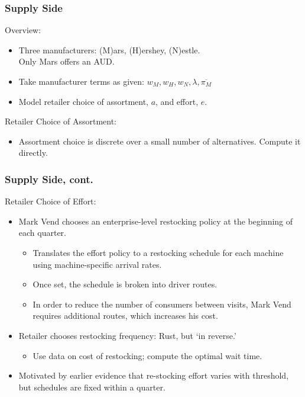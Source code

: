 \documentclass[aspectratio=169]{beamer}
\begin{document}
\begin{frame}
\frametitle{Supply Side}
Overview:
\begin{itemize}
\item Three manufacturers:  (M)ars, (H)ershey, (N)estle. \\ Only Mars offers an AUD.
\item Take manufacturer terms as given: $w_M, w_H, w_N, \lambda, \overline{\pi_M}$
\item Model retailer choice of assortment, $a$, and effort, $e$.%
\end{itemize}
Retailer Choice of Assortment:
\begin{itemize}
\item Assortment choice is discrete over a small number of alternatives. Compute it directly.
\end{itemize}
\end{frame}

\begin{frame}
\frametitle{Supply Side, cont.}

Retailer Choice of Effort:
\begin{itemize}
\item Mark Vend chooses an enterprise-level restocking policy at the beginning of each quarter.
	\begin{itemize}
	\item Translates the effort policy to a restocking schedule for each machine using machine-specific arrival rates.
	\item Once set, the schedule is broken into driver routes.
	\item In order to reduce the number of consumers between visits, Mark Vend requires additional routes, which increases his cost.
	\end{itemize}
\item Retailer chooses restocking frequency: Rust, but `in reverse.'
\begin{itemize}
\item Use data on cost of restocking; compute the optimal wait time.
\end{itemize}
\item Motivated by earlier evidence that re-stocking effort varies with threshold, but schedules are fixed within a quarter.
\end{itemize}
\end{frame}
\end{document}
